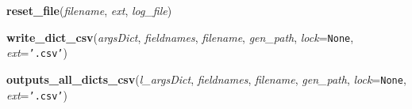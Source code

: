     \vspace{0.5ex}

\hspace{.8\funcindent}\begin{boxedminipage}{\funcwidth}

    \raggedright \textbf{reset\_file}(\textit{filename}, \textit{ext}, \textit{log\_file})

\setlength{\parskip}{2ex}
\setlength{\parskip}{1ex}
    \end{boxedminipage}

    \label{etude:utils:sysutils:write_dict_csv}

    \vspace{0.5ex}

\hspace{.8\funcindent}\begin{boxedminipage}{\funcwidth}

    \raggedright \textbf{write\_dict\_csv}(\textit{argsDict}, \textit{fieldnames}, \textit{filename}, \textit{gen\_path}, \textit{lock}={\tt None}, \textit{ext}={\tt \texttt{'}\texttt{.csv}\texttt{'}})

\setlength{\parskip}{2ex}
\setlength{\parskip}{1ex}
    \end{boxedminipage}

    \label{etude:utils:sysutils:outputs_all_dicts_csv}

    \vspace{0.5ex}

\hspace{.8\funcindent}\begin{boxedminipage}{\funcwidth}

    \raggedright \textbf{outputs\_all\_dicts\_csv}(\textit{l\_argsDict}, \textit{fieldnames}, \textit{filename}, \textit{gen\_path}, \textit{lock}={\tt None}, \textit{ext}={\tt \texttt{'}\texttt{.csv}\texttt{'}})

\setlength{\parskip}{2ex}
\setlength{\parskip}{1ex}
    \end{boxedminipage}



